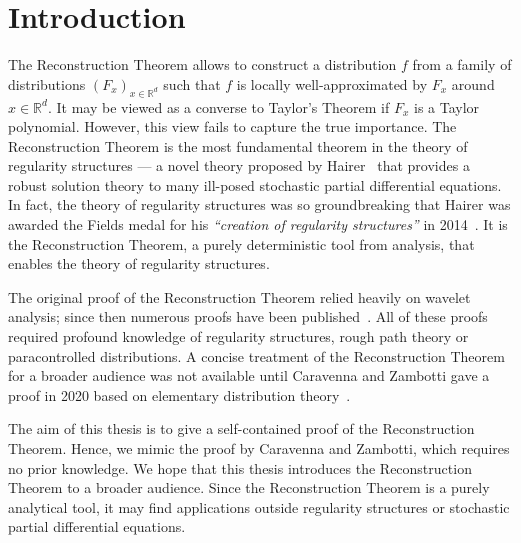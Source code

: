 \chapter{Introduction} 

The Reconstruction Theorem allows to construct a distribution \(f\) from a family of distributions \({(F_{x})}_{x \in \mathbb{R}^d}\) such that \(f\) is locally well-approximated by \(F_x\) around \(x \in \mathbb{R}^d\). It may be viewed as a converse to Taylor's Theorem if \(F_x\) is a Taylor polynomial. However, this view fails to capture the true importance. The Reconstruction Theorem is the most fundamental theorem in the theory of regularity structures --- a novel theory proposed by Hairer~\cite{hairer2014theory} that provides a robust solution theory to many ill-posed stochastic partial differential equations. In fact, the theory of regularity structures was so groundbreaking that Hairer was awarded the Fields medal for his \emph{``creation of regularity structures''} in 2014~\cite{FieldsMedalHairer}. It is the Reconstruction Theorem, a purely deterministic tool from analysis, that enables the theory of regularity structures.

The original proof of the Reconstruction Theorem relied heavily on wavelet analysis; since then numerous proofs have been published~\cite{hairer2017reconstruction, otto2019quasilinear, gubinelli2015paracontrolled, martin2020littlewood, singh2018elementary}. All of these proofs required profound knowledge of regularity structures, rough path theory or paracontrolled distributions. A concise treatment of the Reconstruction Theorem for a broader audience was not available until Caravenna and Zambotti gave a proof in 2020 based on elementary distribution theory~\cite{caravenna2021hairer}. 

The aim of this thesis is to give a self-contained proof of the Reconstruction Theorem. Hence, we mimic the proof by Caravenna and Zambotti, which requires no prior knowledge. We hope that this thesis introduces the Reconstruction Theorem to a broader audience. Since the Reconstruction Theorem is a purely analytical tool, it may find applications outside regularity structures or stochastic partial differential equations.

